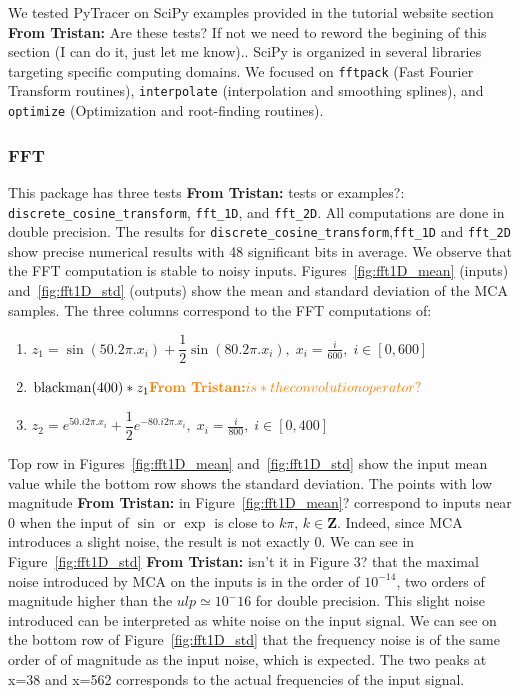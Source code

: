 \documentclass[11pt]{article}
\newcommand{\tristan}[1]{\color{orange}\textbf{From Tristan:} #1\color{black}\xspace}
\newcommand{\pytracer}[0]{PyTracer\xspace}
\begin{document}
We tested \pytracer on SciPy examples provided in the tutorial website section \tristan{Are these tests? If not we need to reword the begining of this section (I can do it, just let me know).}.
SciPy is organized in several libraries targeting specific computing domains. We focused on \texttt{fftpack} (Fast Fourier Transform routines), \texttt{interpolate} (interpolation and smoothing splines), and \texttt{optimize} (Optimization and root-finding routines).

\subsubsection{FFT}

This package has three tests \tristan{tests or examples?}: \texttt{discrete\_cosine\_transform}, \texttt{fft\_1D}, and \texttt{fft\_2D}. All computations are done in double precision.
The results for \texttt{discrete\_cosine\_transform},\texttt{fft\_1D} and  \texttt{fft\_2D} show
precise numerical results with 48 significant bits in average. 
We observe that the FFT computation is stable to noisy inputs. Figures~\ref{fig:fft1D_mean} (inputs) and~\ref{fig:fft1D_std} (outputs)
show the mean and standard deviation of the MCA samples. 
The three columns correspond to the FFT computations of: 
\begin{enumerate}
\item $z_1 = \sin(50 . 2\pi . x_i) + \dfrac{1}{2} \sin(80 . 2\pi . x_i),\; x_i = \frac{i}{600},\; i \in [0,600]$
\item $\mathrm{blackman}(400)*z_1 \tristan{is * the convolution operator?}$
\item $ z_2= e^{50 . i 2\pi . x_i} + \dfrac{1}{2} e^{-80 . i2\pi .x_i },\; x_i = \frac{i}{800},\; i \in [0,400] $
\end{enumerate}

Top row in Figures~\ref{fig:fft1D_mean} and~\ref{fig:fft1D_std} 
show the input mean value while the bottom row shows the standard deviation.
The points with low magnitude \tristan{in Figure~\ref{fig:fft1D_mean}?} correspond to inputs near 0 when the input of $\sin$ or 
$\exp$ is close to $k\pi$, $k \in \mathbf{Z}$.
Indeed, since MCA introduces a slight noise, the result is not exactly 0.
We can see in Figure~\ref{fig:fft1D_std} \tristan{isn't it in Figure 3?} that the maximal noise introduced by MCA on the
inputs is in the order of $10^{-14}$, two orders of magnitude higher than the 
$ulp \simeq 10^-16$ for double precision. 
This slight noise introduced can be interpreted as white noise on the input signal. 
We can see on the bottom row of Figure~\ref{fig:fft1D_std} that the frequency noise is of 
the same order of of magnitude as the input noise, which is expected. 
The two peaks at x=38 and x=562 corresponds to the actual frequencies of the input signal.
\end{document}
